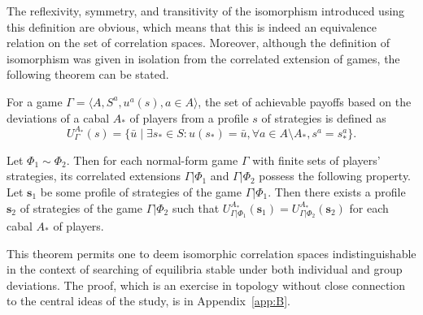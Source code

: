 The reflexivity, symmetry, and transitivity of the isomorphism introduced using this definition are obvious, which means that this is indeed an equivalence relation on the set of correlation spaces. Moreover, although the definition of isomorphism was given in isolation from the correlated extension of games, the following theorem can be stated. %
\begin{definition}
	For a game $\Gamma = \langle A, S^a, u^a(s), a \in A \rangle$, the set of achievable payoffs based on the deviations of a cabal $A_*$ of players from a profile $s$ of strategies is defined as %
	\begin{equation*}
		U_\Gamma^{A_*}(s) = \{\bar{u} \mid \exists s_* \in S : u(s_*) = \bar{u}, \forall a \in A \setminus A_*, s^a = s_*^a\}.
	\end{equation*}
\end{definition}
\begin{theorem}
	Let $\Phi_1 \sim \Phi_2$. Then for each normal-form game $\Gamma$ with finite sets of players’ strategies, its correlated extensions $\Gamma | \Phi_1$ and $\Gamma | \Phi_2$ possess the following property. Let $\mathbf{s}_1$ be some profile of strategies of the game $\Gamma | \Phi_1$. Then there exists a profile $\mathbf{s}_2$ of strategies of the game $\Gamma | \Phi_2$ such that $U_{\Gamma | \Phi_1}^{A_*}(\mathbf{s}_1) = U_{\Gamma | \Phi_2}^{A_*}(\mathbf{s}_2)$ for each cabal $A_*$ of players. %
\end{theorem}

This theorem permits one to deem isomorphic correlation spaces indistinguishable in the context of searching of equilibria stable under both individual and group deviations. The proof, which is an exercise in topology without close connection to the central ideas of the study, is in Appendix~\cref{app:B}. %

